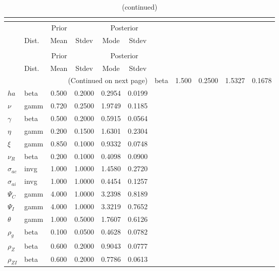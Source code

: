  
\begin{center}
\begin{longtable}{llcccc} 
\caption{Results from posterior maximization (parameters)}\\
 \label{Table:Posterior:1}\\
\toprule 
  & \multicolumn{3}{c}{Prior}  &  \multicolumn{2}{c}{Posterior} \\
  \cmidrule(r{.75em}){2-4} \cmidrule(r{.75em}){5-6}
  & Dist. & Mean  & Stdev & Mode & Stdev \\ 
\midrule \endfirsthead 
\caption{(continued)}\\
 \bottomrule 
  & \multicolumn{3}{c}{Prior}  &  \multicolumn{2}{c}{Posterior} \\
  \cmidrule(r{.75em}){2-4} \cmidrule(r{.75em}){5-6}
  & Dist. & Mean  & Stdev & Mode & Stdev \\ 
\midrule \endhead 
\bottomrule \multicolumn{6}{r}{(Continued on next page)}\endfoot 
\bottomrule\endlastfoot 
${\sigma}$ & beta &   1.500 & 0.2500 &   1.5327 &  0.1678 \\ 
${ha}$ & beta &   0.500 & 0.2000 &   0.2954 &  0.0199 \\ 
$\nu$ & gamm &   0.720 & 0.2500 &   1.9749 &  0.1185 \\ 
$\gamma$ & beta &   0.500 & 0.2000 &   0.5915 &  0.0564 \\ 
${\eta}$ & gamm &   0.200 & 0.1500 &   1.6301 &  0.2304 \\ 
$\xi$ & gamm &   0.850 & 0.1000 &   0.9332 &  0.0748 \\ 
${\nu_R}$ & beta &   0.200 & 0.1000 &   0.4098 &  0.0900 \\ 
${\sigma_{ac}}$ & invg &   1.000 & 1.0000 &   1.4580 &  0.2720 \\ 
${\sigma_{ai}}$ & invg &   1.000 & 1.0000 &   0.4454 &  0.1257 \\ 
${\Psi_{C}}$ & gamm &   4.000 & 1.0000 &   3.2398 &  0.8189 \\ 
${\Psi_I}$ & gamm &   4.000 & 1.0000 &   3.3219 &  0.7652 \\ 
${\theta}$ & gamm &   1.000 & 0.5000 &   1.7607 &  0.6126 \\ 
${\rho_g}$ & beta &   0.100 & 0.0500 &   0.4628 &  0.0782 \\ 
${\rho_Z}$ & beta &   0.600 & 0.2000 &   0.9043 &  0.0777 \\ 
${\rho_{ZI}}$ & beta &   0.600 & 0.2000 &   0.7786 &  0.0613 \\ 

\end{longtable}
\end{center}
